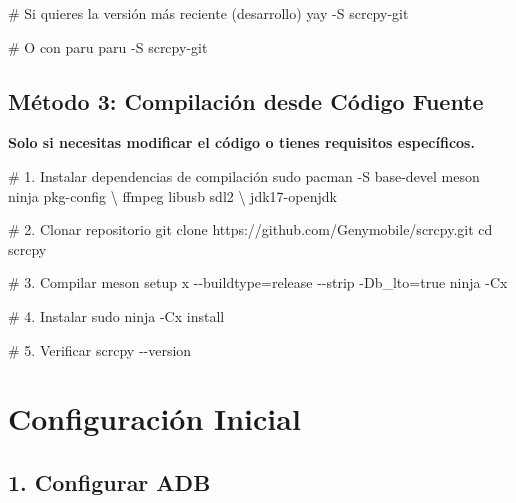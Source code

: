 \documentclass[
  doc,
  floatsintext,
  longtable,
  a4paper,
  nolmodern,
  notxfonts,
  notimes,
  12pt,
  colorlinks=true,linkcolor=blue,citecolor=blue,urlcolor=blue]{apa7}
\newenvironment{Shaded}{\begin{snugshade}}{\end{snugshade}}
\newcommand{\AttributeTok}[1]{\textcolor[rgb]{0.40,0.45,0.13}{#1}}
\newcommand{\BuiltInTok}[1]{\textcolor[rgb]{0.00,0.23,0.31}{#1}}
\newcommand{\CommentTok}[1]{\textcolor[rgb]{0.37,0.37,0.37}{#1}}
\newcommand{\DataTypeTok}[1]{\textcolor[rgb]{0.68,0.00,0.00}{#1}}
\newcommand{\ExtensionTok}[1]{\textcolor[rgb]{0.00,0.23,0.31}{#1}}
\newcommand{\FunctionTok}[1]{\textcolor[rgb]{0.28,0.35,0.67}{#1}}
\newcommand{\NormalTok}[1]{\textcolor[rgb]{0.00,0.23,0.31}{#1}}
\newcommand{\OperatorTok}[1]{\textcolor[rgb]{0.37,0.37,0.37}{#1}}
\begin{document}
\begin{Shaded}
\begin{Highlighting}[]
\CommentTok{\# Si quieres la versión más reciente (desarrollo)}
\ExtensionTok{yay} \AttributeTok{{-}S}\NormalTok{ scrcpy{-}git}

\CommentTok{\# O con paru}
\ExtensionTok{paru} \AttributeTok{{-}S}\NormalTok{ scrcpy{-}git}
\end{Highlighting}
\end{Shaded}

\subsection{Método 3: Compilación desde Código
Fuente}\label{muxe9todo-3-compilaciuxf3n-desde-cuxf3digo-fuente}

\textbf{Solo si necesitas modificar el código o tienes requisitos
específicos.}

\begin{Shaded}
\begin{Highlighting}[]
\CommentTok{\# 1. Instalar dependencias de compilación}
\FunctionTok{sudo}\NormalTok{ pacman }\AttributeTok{{-}S}\NormalTok{ base{-}devel meson ninja pkg{-}config }\DataTypeTok{\textbackslash{}}
\NormalTok{  ffmpeg libusb sdl2 }\DataTypeTok{\textbackslash{}}
\NormalTok{  jdk17{-}openjdk}

\CommentTok{\# 2. Clonar repositorio}
\FunctionTok{git}\NormalTok{ clone https://github.com/Genymobile/scrcpy.git}
\BuiltInTok{cd}\NormalTok{ scrcpy}

\CommentTok{\# 3. Compilar}
\ExtensionTok{meson}\NormalTok{ setup x }\AttributeTok{{-}{-}buildtype}\OperatorTok{=}\NormalTok{release }\AttributeTok{{-}{-}strip} \AttributeTok{{-}Db\_lto}\OperatorTok{=}\NormalTok{true}
\ExtensionTok{ninja} \AttributeTok{{-}Cx}

\CommentTok{\# 4. Instalar}
\FunctionTok{sudo}\NormalTok{ ninja }\AttributeTok{{-}Cx}\NormalTok{ install}

\CommentTok{\# 5. Verificar}
\ExtensionTok{scrcpy} \AttributeTok{{-}{-}version}
\end{Highlighting}
\end{Shaded}

\section{Configuración Inicial}\label{configuraciuxf3n-inicial}

\subsection{1. Configurar ADB}\label{configurar-adb}
\end{document}
